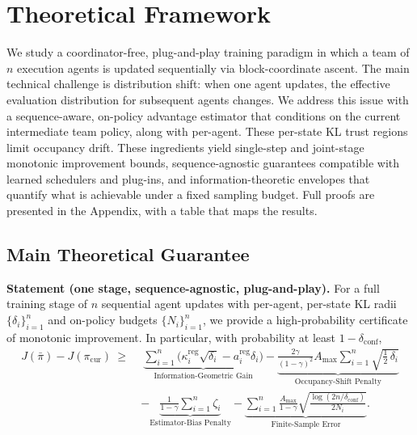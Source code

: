 \documentclass[sigconf]{aamas}
\begin{document}
\section{Theoretical Framework}
\label{sec:theory}

We study a coordinator-free, plug-and-play training paradigm in which a team of $n$ execution agents is updated sequentially via block-coordinate ascent. The main technical challenge is distribution shift: when one agent updates, the effective evaluation distribution for subsequent agents changes.
We address this issue with a sequence-aware, on-policy advantage estimator that conditions on the current intermediate team policy, along with per-agent. These per-state KL trust regions limit occupancy drift. These ingredients yield single-step and joint-stage monotonic improvement bounds, sequence-agnostic guarantees compatible with learned schedulers and plug-ins, and information-theoretic envelopes that quantify what is achievable under a fixed sampling budget. Full proofs are presented in the Appendix, with a table that maps the results.

\subsection{Main Theoretical Guarantee}
\label{subsec:main-guarantee}

\noindent\textbf{Statement (one stage, sequence-agnostic, plug-and-play).}
For a full training stage of $n$ sequential agent updates with per-agent, per-state KL radii $\{\delta_i\}_{i=1}^n$ and on-policy budgets $\{N_i\}_{i=1}^n$, we provide a high-probability certificate of monotonic improvement. In particular, with probability at least $1-\delta_{\mathrm{conf}}$,
% 
\[
\begin{aligned}
J(\bar\pi)-J(\pi_{\mathrm{cur}}) \ \ge\ 
&\ \underbrace{\sum_{i=1}^{n}\Big(\kappa_i^{\mathrm{reg}}\sqrt{\delta_i}-a_i^{\mathrm{reg}}\delta_i\Big)}_{\text{Information-Geometric Gain}} 
- \underbrace{\frac{2\gamma}{(1-\gamma)^2}A_{\max}\sum_{i=1}^{n}\sqrt{\tfrac12\,\delta_i}}_{\text{Occupancy-Shift Penalty}} \\
& - \underbrace{\frac{1}{1-\gamma}\sum_{i=1}^{n}\zeta_i}_{\text{Estimator-Bias Penalty}} 
- \underbrace{\sum_{i=1}^{n}\frac{A_{\max}}{1-\gamma}\sqrt{\frac{\log(2n/\delta_{\mathrm{conf}})}{2N_i}}}_{\text{Finite-Sample Error}}.
\end{aligned}
\]
\end{document}
